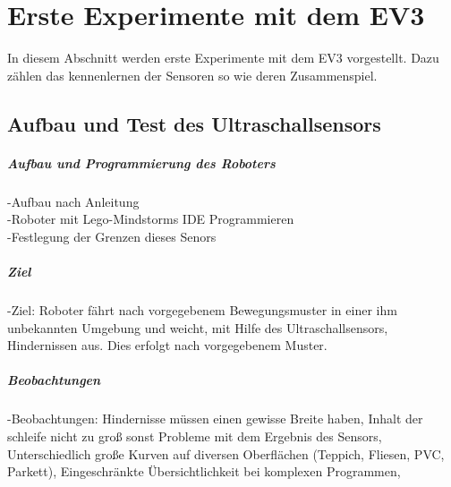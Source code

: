 \chapter{Erste Experimente mit dem EV3}
In diesem Abschnitt werden erste Experimente mit dem EV3 vorgestellt. Dazu zählen das kennenlernen der Sensoren so wie deren Zusammenspiel. 
\section{Aufbau und Test des Ultraschallsensors}
\paragraph{Aufbau und Programmierung des Roboters}
-Aufbau nach Anleitung\\
-Roboter mit Lego-Mindstorms IDE Programmieren \\
-Festlegung der Grenzen dieses Senors\\
\paragraph{Ziel}
-Ziel: Roboter fährt nach vorgegebenem Bewegungsmuster in einer ihm unbekannten Umgebung und weicht, mit Hilfe des Ultraschallsensors, Hindernissen aus. Dies erfolgt nach vorgegebenem Muster.\\ 
\paragraph{Beobachtungen}
-Beobachtungen: Hindernisse müssen einen gewisse Breite haben, Inhalt der schleife nicht zu groß sonst Probleme mit dem Ergebnis des Sensors, Unterschiedlich große Kurven auf diversen Oberflächen (Teppich, Fliesen, PVC, Parkett), Eingeschränkte Übersichtlichkeit bei komplexen Programmen, \\
